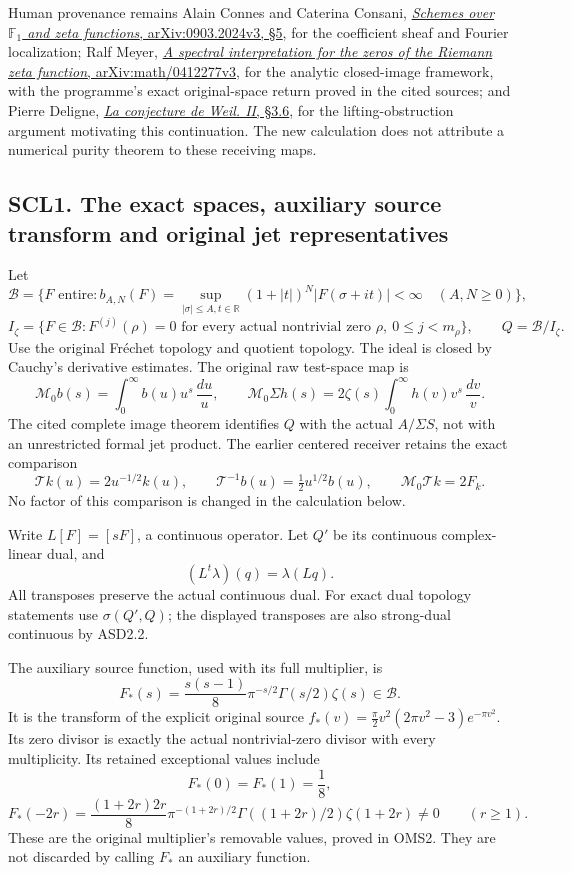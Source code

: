 Human provenance remains Alain Connes and Caterina Consani,
\href{https://arxiv.org/abs/0903.2024v3}{\emph{Schemes over
\(\mathbb F_1\) and zeta functions}, arXiv:0903.2024v3, §5}, for the
coefficient sheaf and Fourier localization; Ralf Meyer,
\href{https://arxiv.org/abs/math/0412277v3}{\emph{A spectral
interpretation for the zeros of the Riemann zeta function},
arXiv:math/0412277v3}, for the analytic closed-image framework, with the
programme's exact original-space return proved in the cited sources; and
Pierre Deligne,
\href{https://www.numdam.org/item/PMIHES_1980__52__137_0/}{\emph{La
conjecture de Weil. II}, §3.6}, for the lifting-obstruction argument
motivating this continuation. The new calculation does not attribute a
numerical purity theorem to these receiving maps.

\subsection{SCL1. The exact spaces, auxiliary source transform and
original jet
representatives}\label{scl1.-the-exact-spaces-auxiliary-source-transform-and-original-jet-representatives}

Let \[
 \mathcal B=\{F\text{ entire}:
 b_{A,N}(F)=\sup_{|\sigma|\le A,t\in\mathbb R}
 (1+|t|)^N|F(\sigma+it)|<\infty\quad(A,N\ge0)\},
\] \[
 I_\zeta=\{F\in\mathcal B:F^{(j)}(\rho)=0
 \text{ for every actual nontrivial zero }\rho,\
 0\le j<m_\rho\},\qquad Q=\mathcal B/I_\zeta .
 \tag{SCL1.1}
\] Use the original Fréchet topology and quotient topology. The ideal is
closed by Cauchy's derivative estimates. The original raw test-space map
is \[
 \mathcal M_0b(s)=\int_0^\infty b(u)u^s\,\frac{du}{u},\qquad
 \mathcal M_0\Sigma h(s)
 =2\zeta(s)\int_0^\infty h(v)v^s\,\frac{dv}{v}.
 \tag{SCL1.2}
\] The cited complete image theorem identifies \(Q\) with the actual
\(A/\Sigma S\), not with an unrestricted formal jet product. The earlier
centered receiver retains the exact comparison \[
 \mathcal Tk(u)=2u^{-1/2}k(u),\qquad
 \mathcal T^{-1}b(u)=\tfrac12u^{1/2}b(u),\qquad
 \mathcal M_0\mathcal Tk=2F_k.
 \tag{SCL1.3}
\] No factor of this comparison is changed in the calculation below.

Write \(L[F]=[sF]\), a continuous operator. Let \(Q'\) be its continuous
complex-linear dual, and \[
 (L^t\lambda)(q)=\lambda(Lq).
\] All transposes preserve the actual continuous dual. For exact dual
topology statements use \(\sigma(Q',Q)\); the displayed transposes are
also strong-dual continuous by ASD2.2.

The auxiliary source function, used with its full multiplier, is \[
 F_*(s)=\frac{s(s-1)}8\pi^{-s/2}\Gamma(s/2)\zeta(s)\in\mathcal B.
 \tag{SCL1.4}
\] It is the transform of the explicit original source
\(f_*(v)=\frac{\pi}{2}v^2(2\pi v^2-3)e^{-\pi v^2}\). Its zero divisor is
exactly the actual nontrivial-zero divisor with every multiplicity. Its
retained exceptional values include \[
 F_*(0)=F_*(1)=\frac18,
\] \[
 F_*(-2r)=
 \frac{(1+2r)2r}{8}\pi^{-(1+2r)/2}
 \Gamma((1+2r)/2)\zeta(1+2r)\ne0\qquad(r\ge1).
 \tag{SCL1.5}
\] These are the original multiplier's removable values, proved in OMS2.
They are not discarded by calling \(F_*\) an auxiliary function.


